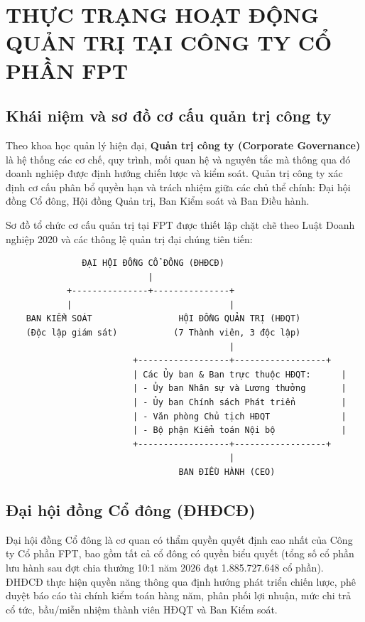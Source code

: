 \section{THỰC TRẠNG HOẠT ĐỘNG QUẢN TRỊ TẠI CÔNG TY CỔ PHẦN FPT}

\subsection{Khái niệm và sơ đồ cơ cấu quản trị công ty}
Theo khoa học quản lý hiện đại, \textbf{Quản trị công ty (Corporate Governance)} là hệ thống các cơ chế, quy trình, mối quan hệ và nguyên tắc mà thông qua đó doanh nghiệp được định hướng chiến lược và kiểm soát. Quản trị công ty xác định cơ cấu phân bổ quyền hạn và trách nhiệm giữa các chủ thể chính: Đại hội đồng Cổ đông, Hội đồng Quản trị, Ban Kiểm soát và Ban Điều hành.

Sơ đồ tổ chức cơ cấu quản trị tại FPT được thiết lập chặt chẽ theo Luật Doanh nghiệp 2020 và các thông lệ quản trị đại chúng tiên tiến:

\begin{center}
\begin{verbatim}
               ĐẠI HỘI ĐỒNG CỔ ĐÔNG (ĐHĐCĐ)
                            |
            +---------------+---------------+
            |                               |
    BAN KIỂM SOÁT                 HỘI ĐỒNG QUẢN TRỊ (HĐQT)
    (Độc lập giám sát)           (7 Thành viên, 3 độc lập)
                                            |
                         +------------------+------------------+
                         | Các Ủy ban & Ban trực thuộc HĐQT:      |
                         | - Ủy ban Nhân sự và Lương thưởng       |
                         | - Ủy ban Chính sách Phát triển         |
                         | - Văn phòng Chủ tịch HĐQT              |
                         | - Bộ phận Kiểm toán Nội bộ             |
                         +------------------+------------------+
                                            |
                                  BAN ĐIỀU HÀNH (CEO)
\end{verbatim}
\end{center}

\subsection{Đại hội đồng Cổ đông (ĐHĐCĐ)}
Đại hội đồng Cổ đông là cơ quan có thẩm quyền quyết định cao nhất của Công ty Cổ phần FPT, bao gồm tất cả cổ đông có quyền biểu quyết (tổng số cổ phần lưu hành sau đợt chia thưởng 10:1 năm 2026 đạt 1.885.727.648 cổ phần). ĐHĐCĐ thực hiện quyền năng thông qua định hướng phát triển chiến lược, phê duyệt báo cáo tài chính kiểm toán hàng năm, phân phối lợi nhuận, mức chi trả cổ tức, bầu/miễn nhiệm thành viên HĐQT và Ban Kiểm soát.

